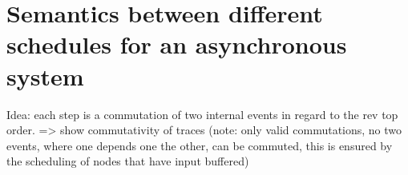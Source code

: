 \section{Semantics between different schedules for an asynchronous system}
\label{sec:semantics_schedules}

Idea: each step is a commutation of two internal events in regard to the rev top order.
=> show commutativity of traces (note: only valid commutations, no two events, where one depends one the other, can be commuted, this is ensured by the scheduling of nodes that have input buffered)



